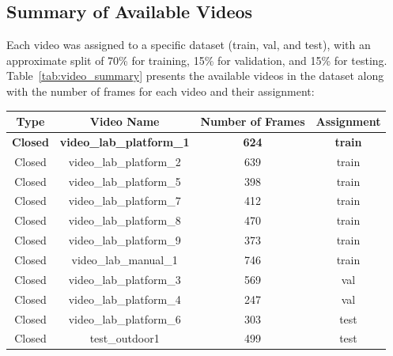 \documentclass[12pt,oneside]{book} %
\begin{document}
\subsection{Summary of Available Videos}
Each video was assigned to a specific dataset (train, val, and test), with an
approximate split of 70\% for training, 15\% for validation, and 15\% for
testing. Table~\ref{tab:video_summary} presents the available videos in the
dataset along with the number of frames for each video and their assignment:

\begin{table}[H]
    \centering
    \begin{tabular}{@{}cccc@{}}
        \toprule
        \textbf{Type}      & \textbf{Video Name}                           & \textbf{Number of Frames} & \textbf{Assignment} \\ \midrule
        \textbf{Closed}    & \textbf{video\_lab\_platform\_1}              & \textbf{624}              & \textbf{train}      \\
        Closed             & video\_lab\_platform\_2                       & 639                       & train               \\
        Closed             & video\_lab\_platform\_5                       & 398                       & train               \\
        Closed             & video\_lab\_platform\_7                       & 412                       & train               \\
        Closed             & video\_lab\_platform\_8                       & 470                       & train               \\
        Closed             & video\_lab\_platform\_9                       & 373                       & train               \\
        Closed             & video\_lab\_manual\_1                         & 746                       & train               \\
        Closed             & video\_lab\_platform\_3                       & 569                       & val                 \\
        Closed             & video\_lab\_platform\_4                       & 247                       & val                 \\
        Closed             & video\_lab\_platform\_6                       & 303                       & test                \\
        Closed             & test\_outdoor1                                & 499                       & test                \\

\end{tabular}
\end{table}
\end{document}
